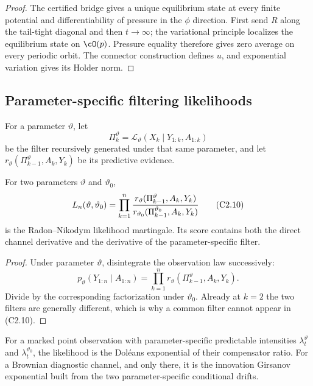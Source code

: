 \begin{proof}
The certified bridge gives a unique equilibrium state at every finite
potential and differentiability of pressure in the $\phi$ direction.  First
send $R$ along the tail-tight diagonal and then $t\to\infty$; the variational
principle localizes the equilibrium state on $\cO(p)$.  Pressure equality
therefore gives zero average on every periodic orbit.  The connector
construction defines $u$, and exponential variation gives its Holder norm.
\end{proof}

\subsection{Parameter-specific filtering likelihoods}

For a parameter $\vartheta$, let
\[
 \Pi_k^\vartheta=
 \mathcal L_\vartheta(X_k\mid Y_{1:k},A_{1:k})             \tag{C2.9}
\]
be the filter recursively generated under that same parameter, and let
$r_\vartheta(\Pi_{k-1}^\vartheta,A_k,Y_k)$ be its predictive evidence.

\begin{proposition}
\label{prop:r31-c2-discrete-likelihood}
For two parameters $\vartheta$ and $\vartheta_0$,
\[
 L_n(\vartheta,\vartheta_0)=
 \prod_{k=1}^n
 {r_\vartheta(\Pi_{k-1}^\vartheta,A_k,Y_k)
  \over
  r_{\vartheta_0}(\Pi_{k-1}^{\vartheta_0},A_k,Y_k)}        \tag{C2.10}
\]
is the Radon--Nikodym likelihood martingale.  Its score contains both the
direct channel derivative and the derivative of the parameter-specific
filter.
\end{proposition}

\begin{proof}
Under parameter $\vartheta$, disintegrate the observation law successively:
\[
 p_\vartheta(Y_{1:n}\mid A_{1:n})
 =\prod_{k=1}^nr_\vartheta(\Pi_{k-1}^\vartheta,A_k,Y_k).
\]
Divide by the corresponding factorization under $\vartheta_0$.  Already at
$k=2$ the two filters are generally different, which is why a common filter
cannot appear in (C2.10).
\end{proof}

For a marked point observation with parameter-specific predictable
intensities $\lambda_t^\vartheta$ and $\lambda_t^{\vartheta_0}$, the
likelihood is the Dol\'eans exponential of their compensator ratio.  For a
Brownian diagnostic channel, and only there, it is the innovation Girsanov
exponential built from the two parameter-specific conditional drifts.

